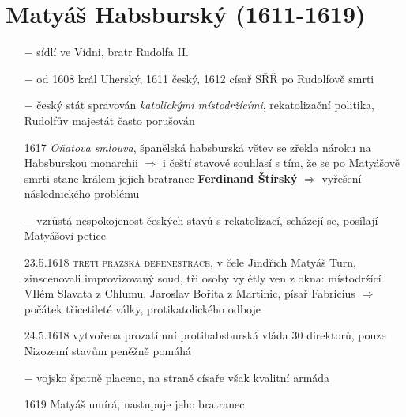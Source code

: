 \documentclass{article}
\begin{document}
\section*{Matyáš Habsburský (1611-1619)}
\begin{itemize}
    \vspace{-0.5em}
    \setlength\itemsep{0.15em}
    \item[$-$] sídlí ve Vídni, bratr Rudolfa II.
    \item[$-$] od 1608 král Uherský, 1611 český, 1612 císař SŘŘ po Rudolfově smrti
    \item[$-$] český stát spravován \textit{katolickými místodržícími}, rekatolizační politika, Rudolfův majestát často porušován
    \item[1617] \textit{Oňatova smlouva}, španělská habsburská větev se zřekla nároku na Habsburskou monarchii $\Rightarrow$ i čeští stavové souhlasí s tím, že se po Matyášově smrti stane králem jejich bratranec \textbf{Ferdinand Štírský} $\Rightarrow$ vyřešení následnického problému
    \item[$-$]  vzrůstá nespokojenost českých stavů s rekatolizací, scházejí se, posílají Matyášovi petice
    \item[23.5.1618] \textsc{třetí pražská defenestrace}, v čele Jindřich Matyáš Turn, zinscenovali improvizovaný soud, tři osoby vylétly ven z okna: místodržící VIlém Slavata z Chlumu, Jaroslav Bořita z Martinic, písař Fabricius $\Rightarrow$  počátek třicetileté války, protikatolického odboje
    \item[24.5.1618] vytvořena prozatímní protihabsburská vláda 30 direktorů, pouze Nizozemí stavům peněžně pomáhá
    \item[$-$] vojsko špatně placeno, na straně císaře však kvalitní armáda
    \item[1619] Matyáš umírá, nastupuje jeho bratranec
\end{itemize}
\end{document}
